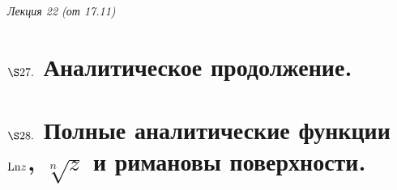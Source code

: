 \begin{flushright}
    \textit{Лекция 22 (от 17.11)}
\end{flushright}
\section{$\S 27.$ Аналитическое продолжение.}
\section{$\S 28.$ Полные аналитические функции $\mathrm{Ln} z$, $\sqrt[n]{z}$ и римановы
  поверхности.}
